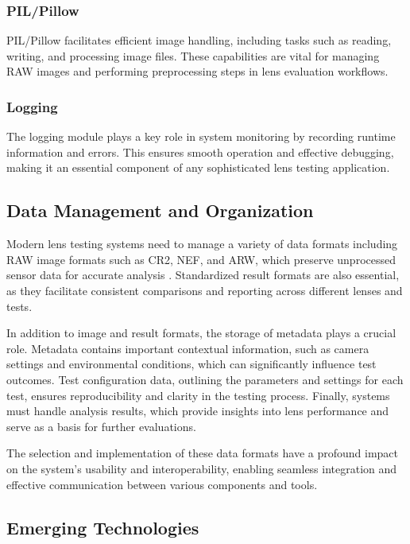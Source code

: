 \subsubsection{PIL/Pillow}  
PIL/Pillow facilitates efficient image handling, including tasks such as reading, writing, and processing image files. These capabilities are vital for managing RAW images and performing preprocessing steps in lens evaluation workflows.

\subsubsection{Logging}  
The logging module plays a key role in system monitoring by recording runtime information and errors. This ensures smooth operation and effective debugging, making it an essential component of any sophisticated lens testing application.

\subsection{Data Management and Organization}

Modern lens testing systems need to manage a variety of data formats including RAW image formats such as CR2, NEF, and ARW, which preserve unprocessed sensor data for accurate analysis \cite{formats}. Standardized result formats are also essential, as they facilitate consistent comparisons and reporting across different lenses and tests.

In addition to image and result formats, the storage of metadata plays a crucial role. Metadata contains important contextual information, such as camera settings and environmental conditions, which can significantly influence test outcomes. Test configuration data, outlining the parameters and settings for each test, ensures reproducibility and clarity in the testing process. Finally, systems must handle analysis results, which provide insights into lens performance and serve as a basis for further evaluations.

The selection and implementation of these data formats have a profound impact on the system's usability and interoperability, enabling seamless integration and effective communication between various components and tools.

\subsection{Emerging Technologies}

